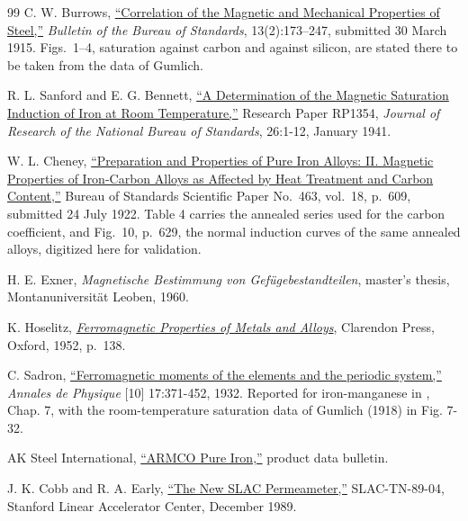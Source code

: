 \documentclass[
  11pt,
]{article}
\begin{document}
\begin{thebibliography}{99}
 C. W. Burrows, \href{https://nvlpubs.nist.gov/nistpubs/bulletin/13/nbsbulletinv13n2p173_A2b.pdf}{``Correlation of the Magnetic and Mechanical Properties of Steel,''} \emph{Bulletin of the Bureau of Standards}, 13(2):173--247, submitted 30 March 1915. Figs.~1--4, saturation against carbon and against silicon, are stated there to be taken from the data of Gumlich.

 R. L. Sanford and E. G. Bennett, \href{https://nvlpubs.nist.gov/nistpubs/jres/26/jresv26n1p1_a1b.pdf}{``A Determination of the Magnetic Saturation Induction of Iron at Room Temperature,''} Research Paper RP1354, \emph{Journal of Research of the National Bureau of Standards}, 26:1-12, January 1941.

 W. L. Cheney, \href{https://nvlpubs.nist.gov/nistpubs/ScientificPapers/nbsscientificpaper463vol18p609_A2b.pdf}{``Preparation and Properties of Pure Iron Alloys: II. Magnetic Properties of Iron-Carbon Alloys as Affected by Heat Treatment and Carbon Content,''} Bureau of Standards Scientific Paper No.~463, vol.~18, p.~609, submitted 24 July 1922. Table 4 carries the annealed series used for the carbon coefficient, and Fig.~10, p.~629, the normal induction curves of the same annealed alloys, digitized here for validation.

 H. E. Exner, \emph{Magnetische Bestimmung von Gefügebestandteilen}, master's thesis, Montanuniversität Leoben, 1960.

 K. Hoselitz, \href{https://archive.org/details/bwb_KR-618-908}{\emph{Ferromagnetic Properties of Metals and Alloys}}, Clarendon Press, Oxford, 1952, p.~138.

 C. Sadron, \href{https://doi.org/10.1051/anphys/193210170371}{``Ferromagnetic moments of the elements and the periodic system,''} \emph{Annales de Physique} {[}10{]} 17:371-452, 1932. Reported for iron-manganese in \cite{bozorth1951}, Chap. 7, with the room-temperature saturation data of Gumlich (1918) in Fig. 7-32.

 AK Steel International, \href{https://www.aksteel.nl/files/downloads/clf_productdata__armco_pure_iron_pdb_euro_final_072022_92.pdf}{``ARMCO Pure Iron,''} product data bulletin.

 J. K. Cobb and R. A. Early, \href{https://www.slac.stanford.edu/pubs/slactns/tn01/slac-tn-89-004.pdf}{``The New SLAC Permeameter,''} SLAC-TN-89-04, Stanford Linear Accelerator Center, December 1989.


\end{thebibliography}
\end{document}
